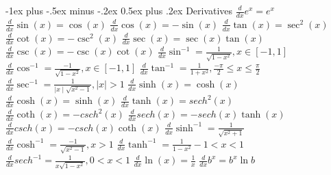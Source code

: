 \documentclass[10pt,a4paper,landscape]{article}
\makeatletter
\renewcommand{\section}{\@startsection{section}{1}{0mm}%
{-1ex plus -.5ex minus -.2ex}%
{0.5ex plus .2ex}%
{\normalfont\large\bfseries}}
\makeatother
\begin{document}
\raggedright
\footnotesize
\begin{multicols*}{5}


	\setlength{\premulticols}{1pt}
	\setlength{\postmulticols}{1pt}
	\setlength{\multicolsep}{1pt}
	\setlength{\columnsep}{2pt}

	\section{Derivatives}
	\scriptsize
	$\frac{d}{dx} e^x=e^x$\newline
	$\frac{d}{dx} \sin(x)=\cos(x)$\newline
	$\frac{d}{dx} \cos(x)=-\sin(x)$\newline
	$\frac{d}{dx} \tan(x)=\sec^2(x)$\newline
	$\frac{d}{dx} \cot(x)=-\csc^2(x)$\newline
	$\frac{d}{dx} \sec(x)=\sec(x)\tan(x)$\newline
	$\frac{d}{dx} \csc(x)=-\csc(x)\cot(x)$\newline
	$\frac{d}{dx} \sin^{-1}=\frac{1}{\sqrt{1-x^2}}, x \in [-1,1]$\newline
	$\frac{d}{dx} \cos^{-1}=\frac{-1}{\sqrt{1-x^2}}, x \in [-1,1]$\newline
	$\frac{d}{dx} \tan^{-1}=\frac{1}{1+x^2}, \frac{-\pi}{2}\le x \le \frac{\pi}{2}$\newline
	$\frac{d}{dx} \sec^{-1}=\frac{1}{\mid x \mid \sqrt{x^2-1}}, |x| > 1$\newline
	$\frac{d}{dx} \sinh(x)=\cosh(x)$\newline
	$\frac{d}{dx} \cosh(x)=\sinh(x)$\newline
	$\frac{d}{dx} \tanh(x)=sech^2(x)$\newline
	$\frac{d}{dx} \coth(x)=-csch^2(x)$\newline
	$\frac{d}{dx} sech(x)=-sech(x)\tanh(x)$\newline
	$\frac{d}{dx} csch(x)=-csch(x)\coth(x)$\newline
	$\frac{d}{dx} \sinh^{-1}=\frac{1}{\sqrt{x^2+1}}$\newline
	$\frac{d}{dx} \cosh^{-1}=\frac{-1}{\sqrt{x^2-1}}, x > 1$\newline
	$\frac{d}{dx} \tanh^{-1}=\frac{1}{1-x^2} -1 < x < 1$\newline
	$\frac{d}{dx} sech^{-1}=\frac{1}{x \sqrt{1-x^2}}, 0 < x < 1$
	$\frac{d}{dx} \ln(x) = \frac{1}{x} $\newline
	$\frac{d}{dx} b^x = b^x \ln{b} $ 


\end{multicols*}
\end{document}
